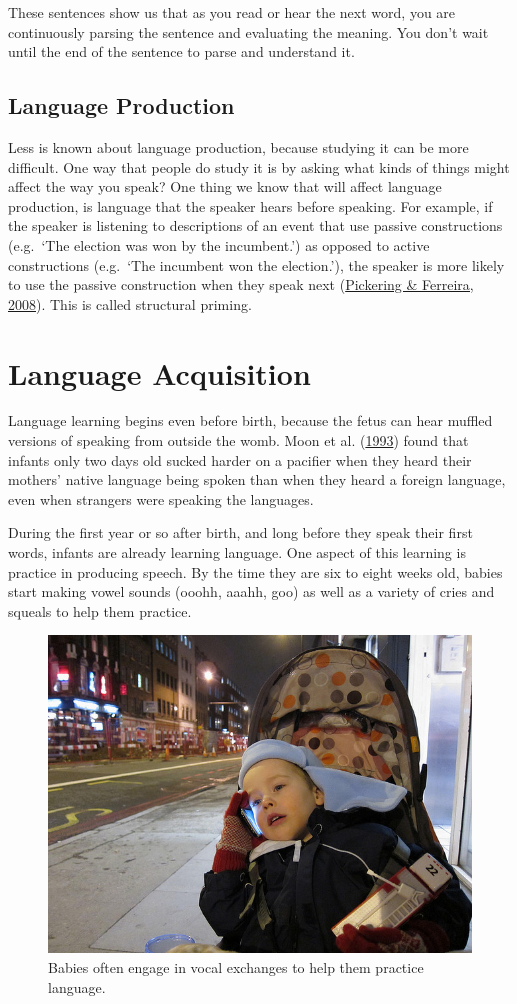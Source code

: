 \documentclass[
]{krantz}
\begin{document}
These sentences show us that as you read or hear the next word, you are continuously parsing the sentence and evaluating the meaning. You don't wait until the end of the sentence to parse and understand it.

\hypertarget{language-production}{%
\subsection*{Language Production}\label{language-production}}


Less is known about language production, because studying it can be more difficult. One way that people do study it is by asking what kinds of things might affect the way you speak? One thing we know that will affect language production, is language that the speaker hears before speaking. For example, if the speaker is listening to descriptions of an event that use passive constructions (e.g.~`The election was won by the incumbent.') as opposed to active constructions (e.g.~`The incumbent won the election.'), the speaker is more likely to use the passive construction when they speak next (\protect\hyperlink{ref-pickering2008}{Pickering \& Ferreira, 2008}). This is called structural priming.

\hypertarget{language-acquisition}{%
\section{Language Acquisition}\label{language-acquisition}}

Language learning begins even before birth, because the fetus can hear muffled versions of speaking from outside the womb. Moon et al. (\protect\hyperlink{ref-Moon1993}{1993}) found that infants only two days old sucked harder on a pacifier when they heard their mothers' native language being spoken than when they heard a foreign language, even when strangers were speaking the languages.

During the first year or so after birth, and long before they speak their first words, infants are already learning language. One aspect of this learning is practice in producing speech. By the time they are six to eight weeks old, babies start making vowel sounds (ooohh, aaahh, goo) as well as a variety of cries and squeals to help them practice.

\begin{figure}

{\centering \includegraphics[width=0.4\linewidth]{images/ch8/fig2} 

}

\caption{Babies often engage in vocal exchanges to help them practice language.}\label{fig:practicing}
\end{figure}
\end{document}
